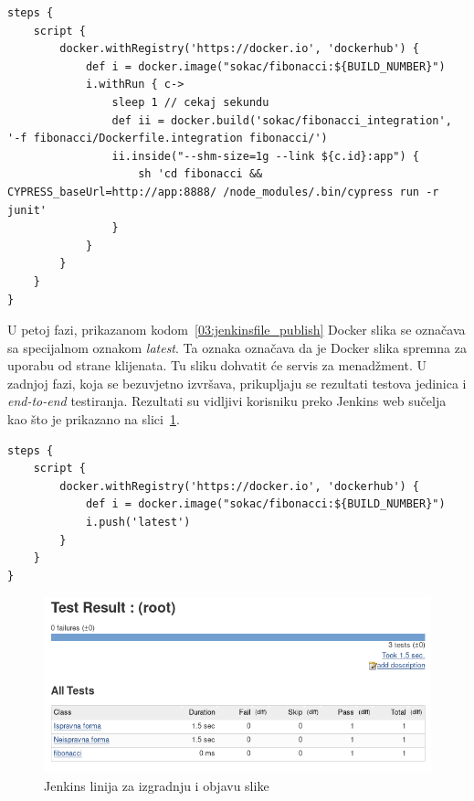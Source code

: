 \begin{lstlisting}[float=h]
steps {
    script {
        docker.withRegistry('https://docker.io', 'dockerhub') {
            def i = docker.image("sokac/fibonacci:${BUILD_NUMBER}")
            i.withRun { c->
                sleep 1 // cekaj sekundu
                def ii = docker.build('sokac/fibonacci_integration', '-f fibonacci/Dockerfile.integration fibonacci/')
                ii.inside("--shm-size=1g --link ${c.id}:app") {
                    sh 'cd fibonacci && CYPRESS_baseUrl=http://app:8888/ /node_modules/.bin/cypress run -r junit'
                }
            }
        }
    }
}
\end{lstlisting}

U petoj fazi, prikazanom kodom~\ref{03:jenkinsfile_publish} Docker slika se označava sa specijalnom
oznakom \textit{latest}. Ta oznaka označava da je Docker slika spremna za uporabu od strane
klijenata. Tu sliku dohvatit će servis za menadžment. U zadnjoj fazi, koja se bezuvjetno izvršava,
prikupljaju se rezultati testova jedinica i \textit{end-to-end} testiranja. Rezultati su vidljivi
korisniku preko Jenkins web sučelja kao što je prikazano na slici~\ref{fig:03jenkins_result}.

\begin{lstlisting}[float=h]
steps {
    script {
        docker.withRegistry('https://docker.io', 'dockerhub') {
            def i = docker.image("sokac/fibonacci:${BUILD_NUMBER}")
            i.push('latest')
        }
    }
}
\end{lstlisting}

\begin{figure}[h]
    \centering
    \includegraphics[width=\textwidth]{img/03/jenkins_result.png}
    \caption{Jenkins linija za izgradnju i objavu slike}%
    \label{fig:03jenkins_result}
\end{figure}

